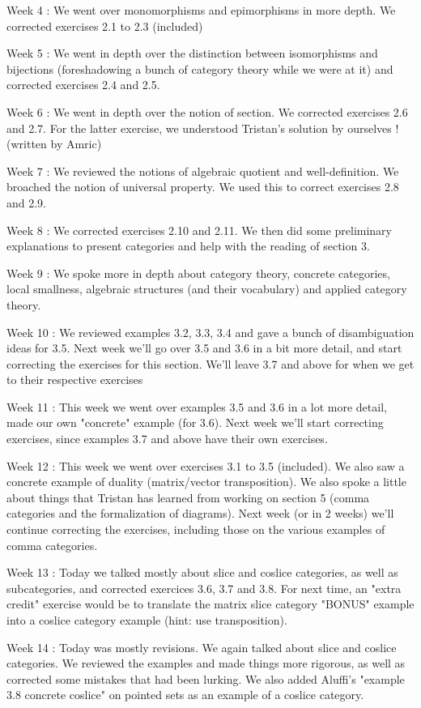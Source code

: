 Week 4 : We went over monomorphisms and epimorphisms in more depth. We corrected exercises 2.1 to 2.3 (included)

Week 5 : We went in depth over the distinction between isomorphisms and bijections (foreshadowing a bunch of category theory while we were at it) and corrected exercises 2.4 and 2.5.

Week 6 : We went in depth over the notion of section. We corrected exercises 2.6 and 2.7. For the latter exercise, we understood Tristan's solution by ourselves ! (written by Amric)

Week 7 : We reviewed the notions of algebraic quotient and well-definition. We broached the notion of universal property. We used this to correct exercises 2.8 and 2.9.

Week 8 : We corrected exercises 2.10 and 2.11. We then did some preliminary explanations to present categories and help with the reading of section 3.

Week 9 : We spoke more in depth about category theory, concrete categories, local smallness, algebraic structures (and their vocabulary) and applied category theory.

Week 10 :
We reviewed examples 3.2, 3.3, 3.4 and gave a bunch of disambiguation ideas for 3.5. Next week we'll go over 3.5 and 3.6 in a bit more detail, and start correcting the exercises for this section. We'll leave 3.7 and above for when we get to their respective exercises

Week 11 :
This week we went over examples 3.5 and 3.6 in a lot more detail, made our own "concrete" example (for 3.6). Next week we'll start correcting exercises, since examples 3.7 and above have their own exercises. 

Week 12 :
This week we went over exercises 3.1 to 3.5 (included). We also saw a concrete example of duality (matrix/vector transposition). We also spoke a little about things that Tristan has learned from working on section 5 (comma categories and the formalization of diagrams). Next week (or in 2 weeks) we'll continue correcting the exercises, including those on the various examples of comma categories.

Week 13 :
Today we talked mostly about slice and coslice categories, as well as subcategories, and corrected exercices 3.6, 3.7 and 3.8.
For next time, an "extra credit" exercise would be to translate the matrix slice category "BONUS" example into a coslice category example (hint: use transposition).

Week 14 :
Today was mostly revisions. We again talked about slice and coslice categories. We reviewed the examples and made things more rigorous, as well as corrected some mistakes that had been lurking. We also added Aluffi's "example 3.8 concrete coslice" on pointed sets as an example of a coslice category.

\newpage
